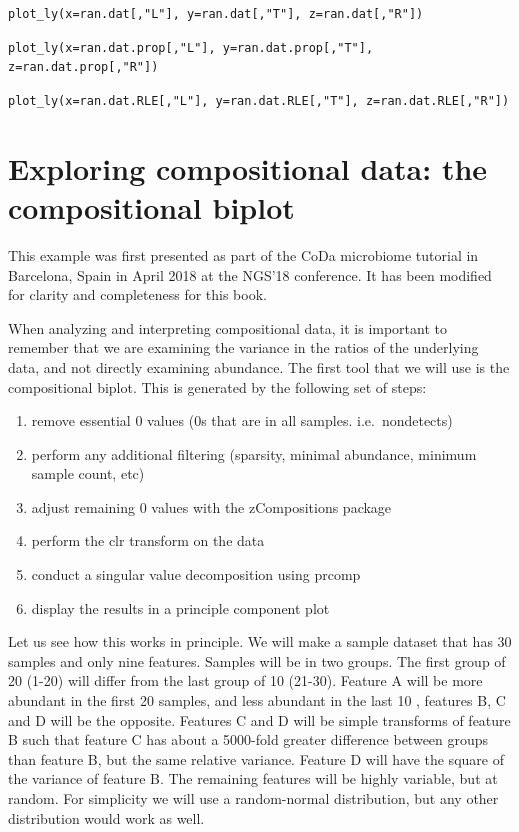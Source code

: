 \documentclass[onecolumn]{article}
\providecommand{\tightlist}{%
  \setlength{\itemsep}{0pt}\setlength{\parskip}{0pt}}
\begin{document}
\texttt{plot\_ly(x=ran.dat[,"L"], y=ran.dat[,"T"], z=ran.dat[,"R"])}

\texttt{plot\_ly(x=ran.dat.prop[,"L"], y=ran.dat.prop[,"T"], z=ran.dat.prop[,"R"])}

\texttt{plot\_ly(x=ran.dat.RLE[,"L"], y=ran.dat.RLE[,"T"], z=ran.dat.RLE[,"R"])}

\hypertarget{biplot}{%
\section{Exploring compositional data: the compositional biplot}\label{biplot}}

\hspace{2cm}\begin{minipage}[ct]{10cm}
\parskip=5pt
\parindent=5pt
This example was first presented as part of the CoDa microbiome tutorial in Barcelona, Spain in April 2018 at the NGS'18 conference.  It has been modified for clarity and completeness for this book.
\end{minipage}
\vspace{1cm}

When analyzing and interpreting compositional data, it is important to remember that we are examining the variance in the ratios of the underlying data, and not directly examining abundance. The first tool that we will use is the compositional biplot. This is generated by the following set of steps:

\begin{enumerate}
\def\labelenumi{\arabic{enumi}.}
\tightlist
\item
  remove essential 0 values (0s that are in all samples. i.e.~nondetects)
\item
  perform any additional filtering (sparsity, minimal abundance, minimum sample count, etc)
\item
  adjust remaining 0 values with the zCompositions package
\item
  perform the clr transform on the data
\item
  conduct a singular value decomposition using prcomp
\item
  display the results in a principle component plot
\end{enumerate}

Let us see how this works in principle. We will make a sample dataset that has 30 samples and only nine features. Samples will be in two groups. The first group of 20 (1-20) will differ from the last group of 10 (21-30). Feature A will be more abundant in the first 20 samples, and less abundant in the last 10 , features B, C and D will be the opposite. Features C and D will be simple transforms of feature B such that feature C has about a 5000-fold greater difference between groups than feature B, but the same relative variance. Feature D will have the square of the variance of feature B. The remaining features will be highly variable, but at random. For simplicity we will use a random-normal distribution, but any other distribution would work as well.
\end{document}
